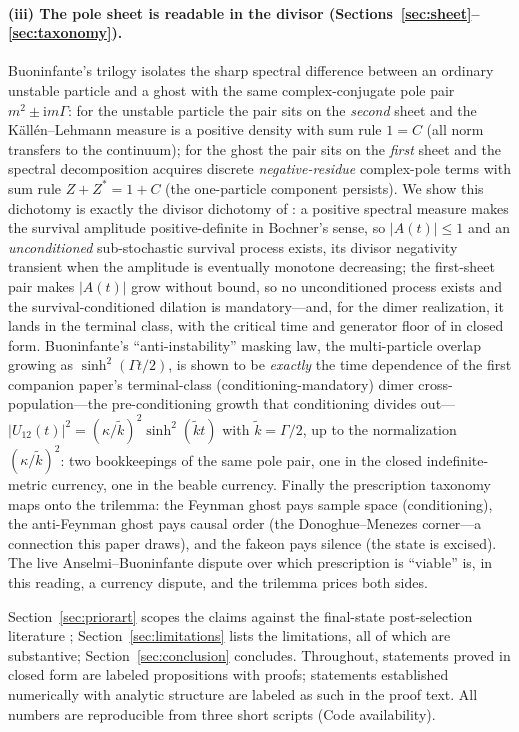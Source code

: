 \documentclass[11pt]{article}
\theoremstyle{definition}
\theoremstyle{remark}
\newcommand{\ii}{\mathrm{i}}
\newcommand{\wt}{\widetilde{k}}
\begin{document}
\paragraph{(iii) The pole sheet is readable in the divisor
(Sections~\ref{sec:sheet}--\ref{sec:taxonomy}).}
Buoninfante's trilogy \cite{BuoninfanteP1,BuoninfanteP2,BuoninfanteP3}
isolates the sharp spectral difference between an ordinary unstable
particle and a ghost with the same complex-conjugate pole pair
$m^{2}\pm\ii m\Gamma$: for the unstable particle the pair sits on the
\emph{second} sheet and the K\"all\'en--Lehmann measure is a positive
density with sum rule $1=C$ (all norm transfers to the continuum);
for the ghost the pair sits on the \emph{first} sheet and the
spectral decomposition acquires discrete \emph{negative-residue}
complex-pole terms with sum rule $Z+Z^{*}=1+C$ (the one-particle
component persists). We show this dichotomy is exactly the divisor
dichotomy of \cite{indivisible}: a positive spectral measure makes
the survival amplitude positive-definite in Bochner's sense, so
$|A(t)|\le1$ and an \emph{unconditioned} sub-stochastic survival
process exists, its divisor negativity transient when the amplitude is
eventually monotone decreasing; the
first-sheet pair makes $|A(t)|$ grow without bound, so no
unconditioned process exists and the survival-conditioned dilation is
mandatory---and, for the dimer realization, it lands in the terminal
class, with the critical time and generator floor of \cite{indivisible}
in closed form.
Buoninfante's ``anti-instability'' masking law, the multi-particle
overlap growing as $\sinh^{2}(\Gamma t/2)$, is shown to be
\emph{exactly} the time dependence of the first companion paper's
terminal-class (conditioning-mandatory) dimer cross-population---the
pre-conditioning growth that conditioning divides out---%
$|U_{12}(t)|^{2}
=(\kappa/\wt)^{2}\sinh^{2}(\wt t)$ with $\wt=\Gamma/2$, up to the
normalization $(\kappa/\wt)^{2}$: two
bookkeepings of the same pole pair, one in the closed indefinite-metric
currency, one in the beable currency. Finally the prescription
taxonomy maps onto the trilemma: the Feynman ghost pays sample space
(conditioning), the anti-Feynman ghost pays causal order (the
Donoghue--Menezes corner---a connection this paper draws), and the
fakeon pays silence (the state is excised). The live Anselmi--Buoninfante dispute over which
prescription is ``viable'' is, in this reading, a currency dispute,
and the trilemma prices both sides.

Section~\ref{sec:priorart} scopes the claims against the final-state
post-selection literature \cite{HorowitzMaldacena,Anastopoulos2024};
Section~\ref{sec:limitations} lists the limitations, all of which are
substantive; Section~\ref{sec:conclusion} concludes. Throughout,
statements proved in closed form are labeled propositions with
proofs; statements established numerically with analytic structure
are labeled as such in the proof text. All numbers are reproducible
from three short scripts (Code availability).
\end{document}
